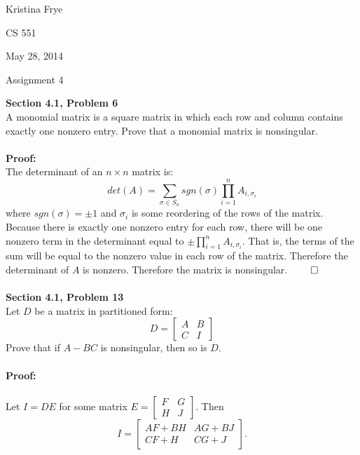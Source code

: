 \documentclass[11pt]{article}
\begin{document}
{\raggedleft Kristina Frye \par}
{\raggedleft CS 551 \par}
{\raggedleft May 28, 2014 \par}
{\raggedleft Assignment 4 \par} 
\noindent\textbf{Section 4.1, Problem 6} \\
A monomial matrix is a square matrix in which each row and column contains
exactly one nonzero entry. Prove that a monomial matrix is nonsingular.
\\
\\
\noindent\textbf{Proof:}\\
The determinant of an $n \times n$ matrix is:
\[
 det(A) = \sum_{\sigma \in S_n} sgn(\sigma) \prod_{i=1}^{n}A_{i, \sigma_i}
\]
where $sgn(\sigma) = \pm 1$ and $\sigma_i$ is some reordering of the rows
of the matrix. Because there is exactly one nonzero entry for each row,
there will be one nonzero term in the determinant equal to 
$\pm \prod_{i=1}^n A_{i, \sigma_i}$. That is, the terms of the sum will
be equal to the nonzero value in each row of the matrix. Therefore
the determinant of $A$ is nonzero. Therefore the matrix is nonsingular.  
$\qed$\\
\\
\noindent\textbf{Section 4.1, Problem 13} \\
Let $D$ be a matrix in partitioned form:
\[
 D = \begin{bmatrix}
  A & B\\
  C & I
 \end{bmatrix}
\]
Prove that if $A-BC$ is nonsingular, then so is $D$.\\
\\
\noindent\textbf{Proof:}\\
\\
Let $I = DE$ for some matrix $E = \begin{bmatrix} F & G\\ H & J \end{bmatrix}$.
Then 
\[
I = \begin{bmatrix} AF + BH & AG + BJ \\ CF + H & CG + J \end{bmatrix}.
\]
\end{document}
